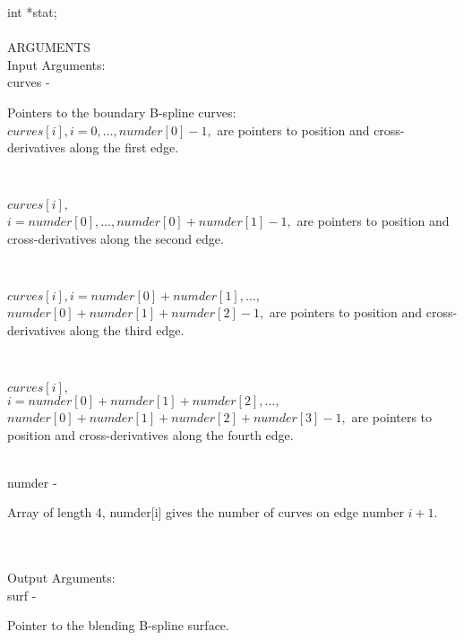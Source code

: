                \>\>    int     \>      *{\fov stat};\\
\\
ARGUMENTS\\
        \>Input Arguments:\\
        \>\>    {\fov curves}   \> - \>
        \begin{minipg2}
          Pointers to the boundary B-spline curves:\\
          $curves[i], i=0,\ldots,numder[0]-1,$
          are pointers to position and cross-derivatives along the first edge.
        \end{minipg2}\\[0.3ex]
        \>\>\>\>
        \begin{minipg2}
          $curves[i],$\\
          $i=numder[0],\ldots,numder[0]+numder[1]-1,$
          are pointers to position  and cross-derivatives
          along the second edge.
        \end{minipg2}\\[0.3ex]
        \>\>\>\>
        \begin{minipg2}
          $curves[i], i=numder[0]+numder[1],\ldots,$\\
          $numder[0]+numder[1]+numder[2]-1,$
          are pointers to position and cross-derivatives
          along the third edge.
        \end{minipg2}\\[0.3ex]
\newpagetabs
        \>\>\>\>
        \begin{minipg2}
          $curves[i],$\\
          $i=numder[0]+numder[1]+numder[2],\ldots,$\\
          $numder[0]+numder[1]+numder[2]+numder[3]-1,$
          are  pointers to position
          and cross-derivatives along the fourth edge.
        \end{minipg2}\\[0.3ex]
        \>\>    {\fov numder}   \> - \> \begin{minipg2}
                                Array of length 4, numder[i] gives the
                                 number of curves on edge number $i+1$.
                                \end{minipg2}\\[0.3ex]
\\
        \>Output Arguments:\\
        \>\>    {\fov surf}\> - \>      \begin{minipg2}
                                Pointer to the blending B-spline surface.
                                \end{minipg2}\\
